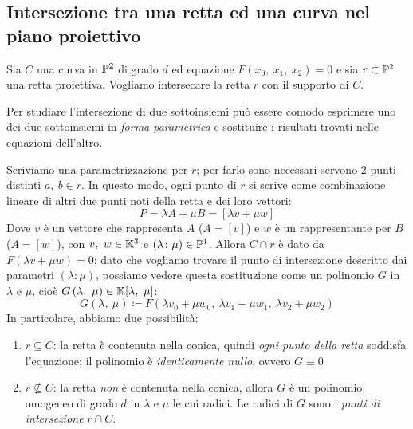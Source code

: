 \subsection{Intersezione tra una retta ed una curva nel piano proiettivo}
Sia $C$ una curva in $\proj[2]{\ }$ di grado $d$ ed equazione $F(x_0,\ x_1,\ x_2)=0$ e sia $r\subset\proj[2]{\ }$ una retta proiettiva. Vogliamo intersecare la retta $r$ con il supporto di $C$.
\begin{tips}
	Per studiare l'intersezione di due sottoinsiemi può essere comodo esprimere uno dei due sottoinsiemi in \textit{forma parametrica} e sostituire i risultati trovati nelle equazioni dell'altro.
\end{tips}
Scriviamo una parametrizzazione per $r$; per farlo sono necessari servono 2 punti distinti $a,\ b\in r$. In questo modo, ogni punto di $r$ si scrive come combinazione lineare di altri due punti noti della retta e dei loro vettori:
\begin{equation}
	P=\lambda A+\mu B=\left[\lambda v+\mu w\right]
\end{equation}
Dove $v$ è un vettore che rappresenta $A$ ($A=[v]$) e $w$ è un rappresentante per $B$ ($A=[w]$), con $v,\ w\in\mathbb{K}^3$ e $(\lambda\colon\mu)\in\proj[1]{\ }$. Allora $C\cap r$ è dato da $F(\lambda v+\mu w)=0$; dato che vogliamo trovare il punto di intersezione descritto dai parametri $(\lambda\colon\mu)$, possiamo vedere questa sostituzione come un polinomio $G$ in $\lambda$ e $\mu$, cioè $G\left(\lambda,\ \mu\right)\in\kamp[\lambda,\ \mu]$:
\begin{equation}
	G\left(\lambda,\ \mu\right)\coloneqq F(\lambda v_0+\mu w_0,\ \lambda v_1+\mu w_1,\ \lambda v_2+\mu w_2)
\end{equation}
In particolare, abbiamo due possibilità:
	\begin{enumerate}
	\item	$r\subseteq C$: la retta è contenuta nella conica, quindi \textit{ogni punto della retta} soddisfa l'equazione; il polinomio è \textit{identicamente nullo}, ovvero $G\equiv 0$
	\item	$r\nsubseteq C$: la retta \textit{non} è contenuta nella conica, allora $G$ è un polinomio omogeneo di grado $d$ in $\lambda$ e $\mu$ le cui radici. Le radici di $G$ sono i \textit{punti di intersezione} $r\cap C$.
\end{enumerate}

